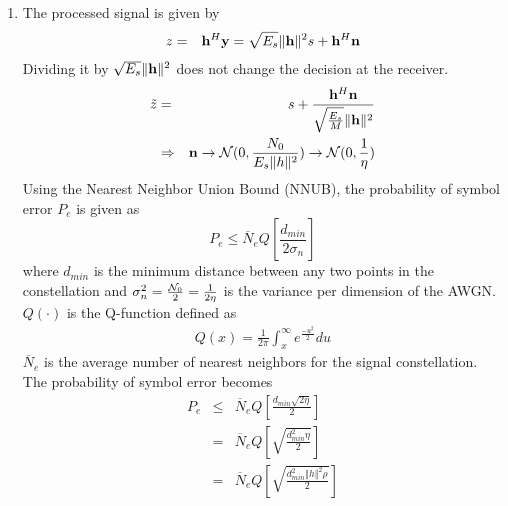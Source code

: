 \documentclass[12pt]{article}
\begin{document}
\begin{enumerate}
\item The processed signal is given by
\begin{eqnarray*}
{ z} & = & {\bf h}^H {\bf y}  = \sqrt{E_s} \Vert {\bf h}\Vert ^2 s + {\bf h}^H {\bf n}
\end{eqnarray*}
Dividing it by $ \sqrt{E_s} \Vert {\bf h}\Vert ^2$  does not change the decision at the receiver.
\begin{eqnarray*}
{\tilde z} &=& s + \frac{ {\bf h}^H {\bf n}  } { \sqrt{\frac{E_s}{M}} \Vert {\bf h}\Vert ^2 } \\
& \Rightarrow &  {\bf n}  \rightarrow {\cal N} ( 0, \frac{N_0}{ {E_s} \Vert  h\Vert ^2}) \rightarrow {\cal N} ( 0, \frac{1}{\eta})
\end{eqnarray*}
Using the Nearest Neighbor Union Bound (NNUB), the probability of symbol error $P_e$ is given as
\begin{equation*}
P_e \le {\overline N_e} Q \left[ \frac{d_{min}} {2 \sigma_n} \right]
\end{equation*}
where $d_{min}$ is the minimum distance between any two points in the constellation and $\sigma_n^2 = \frac {{\cal N}_0}{2} = \frac{1}{2 \eta}$ is the variance per dimension of the AWGN. $Q (\cdot )$ is the Q-function defined as
\begin{eqnarray*}
Q(x) =  \frac{1}{2 \pi} \int_x^\infty  e ^{\frac{-u^2}{2}} du
\end{eqnarray*}
$\overline N_e$ is the average number of nearest neighbors for the signal constellation.
The probability of symbol error becomes
\begin{eqnarray*}
P_e & \le & {\overline N_e} Q \left [ \frac{d_{min} \sqrt{2 \eta}}{2} \right] \\
& = &  {\overline N_e}  Q \left [ \sqrt{\frac{  d_{min}^2 \eta }{2}} \right] \\
& = &  {\overline N_e}  Q \left [ \sqrt{\frac{  d_{min}^2 \Vert h \Vert^2 \rho }{2}} \right]
\end{eqnarray*}


\end{enumerate}
\end{document}
